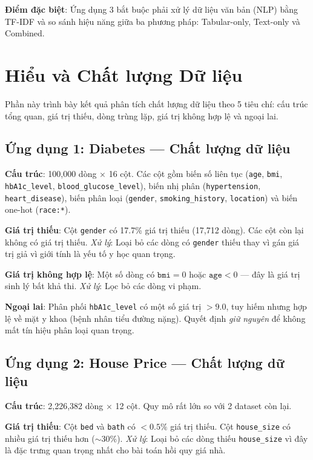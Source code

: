 \documentclass[12pt, a4paper]{article}
\begin{document}
\textbf{Điểm đặc biệt}: Ứng dụng 3 bắt buộc phải xử lý dữ liệu văn bản (NLP) bằng TF-IDF và so sánh hiệu năng giữa ba phương pháp: Tabular-only, Text-only và Combined.

\section{Hiểu và Chất lượng Dữ liệu}

Phần này trình bày kết quả phân tích chất lượng dữ liệu theo 5 tiêu chí: cấu trúc tổng quan, giá trị thiếu, dòng trùng lặp, giá trị không hợp lệ và ngoại lai.

\subsection{Ứng dụng 1: Diabetes — Chất lượng dữ liệu}

\textbf{Cấu trúc}: 100,000 dòng $\times$ 16 cột. Các cột gồm biến số liên tục (\texttt{age}, \texttt{bmi}, \texttt{hbA1c\_level}, \texttt{blood\_glucose\_level}), biến nhị phân (\texttt{hypertension}, \texttt{heart\_disease}), biến phân loại (\texttt{gender}, \texttt{smoking\_history}, \texttt{location}) và biến one-hot (\texttt{race:*}).

\textbf{Giá trị thiếu}: Cột \texttt{gender} có 17.7\% giá trị thiếu (17,712 dòng). Các cột còn lại không có giá trị thiếu. \textit{Xử lý}: Loại bỏ các dòng có \texttt{gender} thiếu thay vì gán giá trị giả vì giới tính là yếu tố y học quan trọng.

\textbf{Giá trị không hợp lệ}: Một số dòng có $\texttt{bmi} = 0$ hoặc $\texttt{age} < 0$ — đây là giá trị sinh lý bất khả thi. \textit{Xử lý}: Lọc bỏ các dòng vi phạm.

\textbf{Ngoại lai}: Phân phối \texttt{hbA1c\_level} có một số giá trị $> 9.0$, tuy hiếm nhưng hợp lệ về mặt y khoa (bệnh nhân tiểu đường nặng). Quyết định \textit{giữ nguyên} để không mất tín hiệu phân loại quan trọng.

\subsection{Ứng dụng 2: House Price — Chất lượng dữ liệu}

\textbf{Cấu trúc}: 2,226,382 dòng $\times$ 12 cột. Quy mô rất lớn so với 2 dataset còn lại.

\textbf{Giá trị thiếu}: Cột \texttt{bed} và \texttt{bath} có $< 0.5\%$ giá trị thiếu. Cột \texttt{house\_size} có nhiều giá trị thiếu hơn ($\sim 30\%$). \textit{Xử lý}: Loại bỏ các dòng thiếu \texttt{house\_size} vì đây là đặc trưng quan trọng nhất cho bài toán hồi quy giá nhà.
\end{document}
